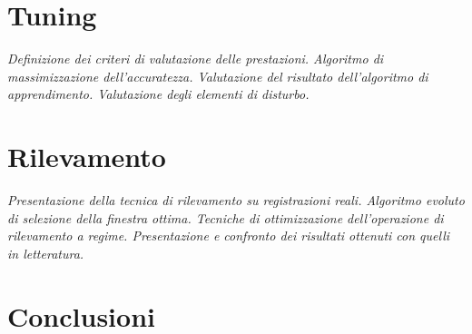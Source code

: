 \documentclass[a4paper,11pt,oneside]{book}
\begin{document}
	\frontespizio
	\tableofcontents
	\newpage

	\linenumbers


	

	

	

	

	\chapter{Tuning}
	\label{chap:Tuning}
	\emph{Definizione dei criteri di valutazione delle prestazioni.
	Algoritmo di massimizzazione dell'accuratezza.
	Valutazione del risultato dell'algoritmo di apprendimento.
	Valutazione degli elementi di disturbo.}

	\chapter{Rilevamento}
	\label{chap:Rilevamento}
	\emph{Presentazione della tecnica di rilevamento su registrazioni reali.
	Algoritmo evoluto di selezione della finestra ottima.
	Tecniche di ottimizzazione dell'operazione di rilevamento a regime.
	Presentazione e confronto dei risultati ottenuti con quelli in letteratura.}

	\chapter{Conclusioni}
	\label{chap:Conclusioni}

	\begin{appendices}

		

		

	\end{appendices}

	\nocite{*}
	
	{}
\end{document}
